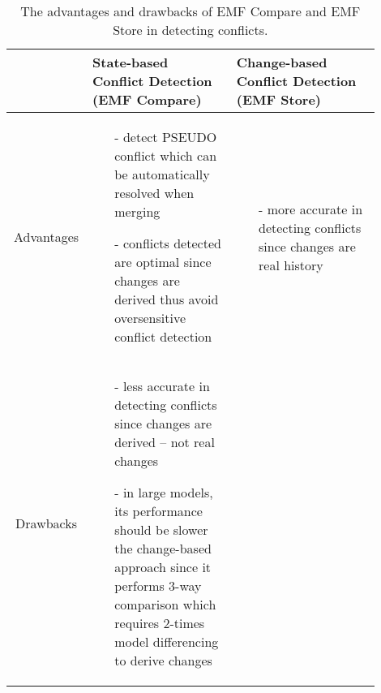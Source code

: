 \begin{table}[ht]
  \centering
  \caption{The advantages and drawbacks of EMF Compare and EMF Store in detecting conflicts.}
  \label{tab:accuracy_emfcompare_emfstore}
\begin{tabular}{|p{0.14\linewidth}|p{0.38\linewidth}|p{0.38\linewidth}|}
    \hline
    & \textbf{State-based Conflict Detection (EMF Compare)}
    & \textbf{Change-based Conflict Detection (EMF Store)}\\
    \hline
    \multicolumn{1}{|c|}{Advantages}
    &
    \begin{minipage}[t]{\linewidth}
    \raggedright
    \begin{itemize}[leftmargin=9pt]
      \setlength\itemsep{2pt}
      \item[-] detect \textsf{PSEUDO} conflict which can be automatically resolved when merging
      \item[-] conflicts detected are optimal since changes are derived thus avoid oversensitive conflict detection
      \item[]
    \end{itemize}
    \end{minipage}
    &
    \begin{minipage}[t]{\linewidth}
      \raggedright
    \begin{itemize}[leftmargin=9pt]
      \setlength\itemsep{2pt}
      \item[-] more accurate in detecting conflicts since changes are real history
      \item[]
    \end{itemize} 
  \end{minipage}
    \\ 
    \hline
    \multicolumn{1}{|c|}{Drawbacks}
    &
    \begin{minipage}[t]{\linewidth}
      \raggedright
    \begin{itemize}[leftmargin=9pt]
      \setlength\itemsep{2pt}
      \item[-] less accurate in detecting conflicts since changes are derived -- not real changes
      \item[-] in large models, its performance should be slower the change-based approach since it performs 3-way comparison which requires 2-times model differencing to derive changes 
      \item[]
    \end{itemize}
    \end{minipage}
    &
    \begin{minipage}[t]{\linewidth}

\end{minipage}
\end{tabular}
\end{table}
